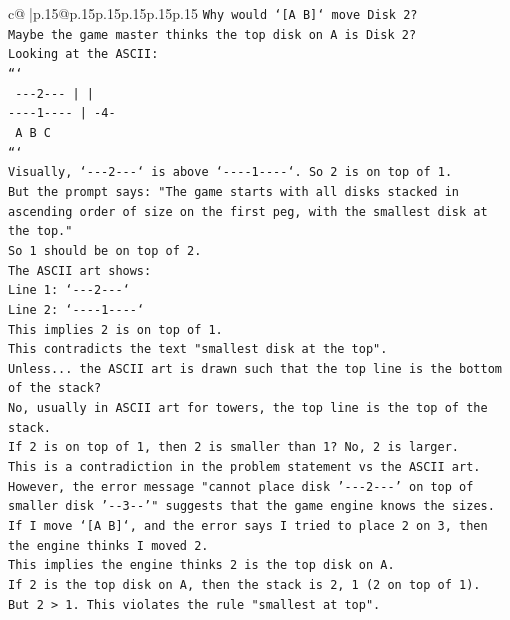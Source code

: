 \documentclass{article}
\begin{document}
{\begin{supertabular}{c@{$\;$}|p{.15\linewidth}@{}p{.15\linewidth}p{.15\linewidth}p{.15\linewidth}p{.15\linewidth}p{.15\linewidth}}
{{{\texttt{Why would `{[}A B{]}` move Disk 2?} \\
\texttt{Maybe the game master thinks the top disk on A is Disk 2?} \\
\texttt{Looking at the ASCII:} \\
\texttt{```} \\
\texttt{ {-}{-}{-}2{-}{-}{-}      |         |    } \\
\texttt{{-}{-}{-}{-}1{-}{-}{-}{-}     |        {-}4{-}   } \\
\texttt{    A         B         C    } \\
\texttt{```} \\
\texttt{Visually, `{-}{-}{-}2{-}{-}{-}` is above `{-}{-}{-}{-}1{-}{-}{-}{-}`. So 2 is on top of 1.} \\
\texttt{But the prompt says: "The game starts with all disks stacked in ascending order of size on the first peg, with the smallest disk at the top."} \\
\texttt{So 1 should be on top of 2.} \\
\texttt{The ASCII art shows:} \\
\texttt{Line 1: `{-}{-}{-}2{-}{-}{-}`} \\
\texttt{Line 2: `{-}{-}{-}{-}1{-}{-}{-}{-}`} \\
\texttt{This implies 2 is on top of 1.} \\
\texttt{This contradicts the text "smallest disk at the top".} \\
\texttt{Unless... the ASCII art is drawn such that the top line is the bottom of the stack?} \\
\texttt{No, usually in ASCII art for towers, the top line is the top of the stack.} \\
\texttt{If 2 is on top of 1, then 2 is smaller than 1? No, 2 is larger.} \\
\texttt{This is a contradiction in the problem statement vs the ASCII art.} \\
\texttt{However, the error message "cannot place disk '{-}{-}{-}2{-}{-}{-}' on top of smaller disk '{-}{-}3{-}{-}'" suggests that the game engine knows the sizes.} \\
\texttt{If I move `{[}A B{]}`, and the error says I tried to place 2 on 3, then the engine thinks I moved 2.} \\
\texttt{This implies the engine thinks 2 is the top disk on A.} \\
\texttt{If 2 is the top disk on A, then the stack is 2, 1 (2 on top of 1).} \\
\texttt{But 2 > 1. This violates the rule "smallest at top".} \\
}}}
\end{supertabular}}
\end{document}
